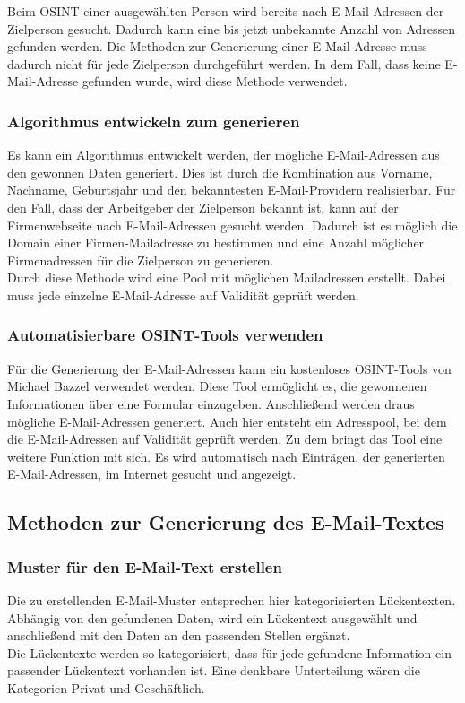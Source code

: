 	Beim OSINT einer ausgewählten Person wird bereits nach E-Mail-Adressen der Zielperson gesucht. Dadurch kann eine bis jetzt unbekannte Anzahl von Adressen gefunden werden. Die Methoden zur Generierung einer E-Mail-Adresse muss dadurch nicht für jede Zielperson durchgeführt werden. In dem Fall, dass keine E-Mail-Adresse gefunden wurde, wird diese Methode verwendet.
	
		\subsubsection{Algorithmus entwickeln zum generieren}
		Es kann ein Algorithmus entwickelt werden, der mögliche E-Mail-Adressen aus den gewonnen Daten generiert. Dies ist durch die Kombination aus Vorname, Nachname, Geburtsjahr und den bekanntesten E-Mail-Providern realisierbar. Für den Fall, dass der Arbeitgeber der Zielperson bekannt ist, kann auf der Firmenwebseite nach E-Mail-Adressen gesucht werden. Dadurch ist es möglich die Domain einer Firmen-Mailadresse zu bestimmen und eine Anzahl möglicher Firmenadressen für die Zielperson zu generieren.\\
		Durch diese Methode wird eine Pool mit möglichen Mailadressen erstellt. Dabei muss jede einzelne E-Mail-Adresse auf Validität geprüft werden.
		
		\subsubsection{Automatisierbare OSINT-Tools verwenden}
		Für die Generierung der E-Mail-Adressen kann ein kostenloses OSINT-Tools von Michael Bazzel verwendet werden. Diese Tool ermöglicht es, die gewonnenen Informationen über eine Formular einzugeben. Anschließend werden draus mögliche E-Mail-Adressen generiert. Auch hier entsteht ein Adresspool, bei dem die E-Mail-Adressen auf Validität geprüft werden. Zu dem bringt das Tool eine weitere Funktion mit sich. Es wird automatisch nach Einträgen, der generierten E-Mail-Adressen, im Internet gesucht und angezeigt. \cite{EmailAssumptions}
		
	\subsection{Methoden zur Generierung des E-Mail-Textes}
		\subsubsection{Muster für den E-Mail-Text erstellen}
		\label{subsubsec:EMailMusterMethode}
		Die zu erstellenden E-Mail-Muster entsprechen hier kategorisierten Lückentexten. Abhängig von den gefundenen Daten, wird ein Lückentext ausgewählt und anschließend mit den Daten an den passenden Stellen ergänzt.\\
		Die Lückentexte werden so kategorisiert, dass für jede gefundene Information ein passender Lückentext vorhanden ist. Eine denkbare Unterteilung wären die Kategorien Privat und Geschäftlich.
	
